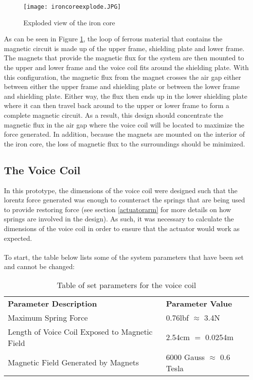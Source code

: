 \begin{figure}[h!]
\centering
\texttt{[image: ironcoreexplode.JPG]}
\caption{Exploded view of the iron core}
\label{fig:ironcoreexplode}
\end{figure}

\noindent As can be seen in Figure \ref{fig:ironcoreexplode}, the loop of ferrous material that contains the magnetic circuit is made up of the upper frame, shielding plate and lower frame. The magnets that provide the magnetic flux for the system are then mounted to the upper and lower frame and the voice coil fits around the shielding plate. With this configuration, the magnetic flux from the magnet crosses the air gap either between either the upper frame and shielding plate or between the lower frame and shielding plate. Either way, the flux then ends up in the lower shielding plate where it can then travel back around to the upper or lower frame to form a complete magnetic circuit. As a result, this design should concentrate the magnetic flux in the air gap where the voice coil will be located to maximize the force generated. In addition, because the magnets are mounted on the interior of the iron core, the loss of magnetic flux to the surroundings should be minimized.

\subsection{The Voice Coil}

In this prototype, the dimensions of the voice coil were designed such that the lorentz force generated was enough to counteract the springs that are being used to provide restoring force (see section \ref{actuatorarm} for more details on how springs are involved in the design). As such, it was necessary to calculate the dimensions of the voice coil in order to ensure that the actuator would work as expected. \\ \\
%
To start, the table below lists some of the system parameters that have been set and cannot be changed:

\begin{table}[h]
\begin{tabular}{l|l}
\textbf{Parameter Description}                                    & \textbf{Parameter Value}  \\
Maximum Spring Force                           & 0.76lbf $\approx$ 3.4N          \\
Length of Voice Coil Exposed to Magnetic Field & 2.54cm $=$ 0.0254m \\
Magnetic Field Generated by Magnets            & 6000 Gauss $\approx$ 0.6 Tesla       
\end{tabular}
\caption{Table of set parameters for the voice coil}
\label{voicecoilparam}
\end{table}

